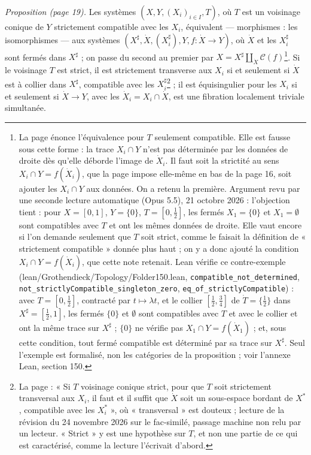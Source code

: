 \documentclass[11pt,a4paper]{article}
\begin{document}
\emph{Proposition (page 19).} Les systèmes $(X, Y, (X_i)_{i \in I}, T)$, où $T$
est un voisinage conique de $Y$ strictement compatible avec les $X_i$, équivalent
— morphismes : les isomorphismes — aux systèmes $(X^{\sharp}, \dot X, (X^{\sharp}_i),
Y, f : \dot X \to Y)$, où $\dot X$ et les $X^{\sharp}_i$ sont fermés dans
$X^{\sharp}$ ; on passe du second au premier par $X = X^{\sharp}
\amalg_{\dot X} \mathcal{C}(f)$\footnote{La page énonce l'équivalence pour $T$
seulement compatible. Elle est fausse sous cette forme : la trace $X_i \cap Y$
n'est pas déterminée par les données de droite dès qu'elle déborde l'image de
$\dot X_i$. Il faut soit la strictité au sens $X_i \cap Y = f(\dot X_i)$, que
la page impose elle-même en bas de la page 16, soit ajouter les $X_i \cap Y$ aux données. On a retenu la première. Argument revu par une seconde lecture automatique (Opus 5.5), 21 octobre 2026 : l'objection tient : pour $X = [0,1]$, $Y = \{0\}$, $T = [0,\frac12]$, les fermés $X_1 = \{0\}$ et $X_1 = \emptyset$ sont compatibles avec $T$ et ont les mêmes données de droite. Elle vaut encore si l'on demande seulement que $T$ soit strict, comme le faisait la définition de « strictement compatible » donnée plus haut ; on y a donc ajouté la condition $X_i \cap Y = f(\dot X_i)$, que cette note retenait. Lean vérifie ce contre-exemple (lean/Grothendieck/Topology/Folder150.lean, \texttt{compatible\_not\_determined}, \texttt{not\_strictlyCompatible\_singleton\_zero}, \texttt{eq\_of\_strictlyCompatible}) : avec $T = [0, \frac12]$, contracté par $t \mapsto \lambda t$, et le collier $[\frac12, \frac34]$ de $\dot T = \{\frac12\}$ dans $X^{\sharp} = [\frac12, 1]$, les fermés $\{0\}$ et $\emptyset$ sont compatibles avec $T$ et avec le collier et ont la même trace sur $X^{\sharp}$ ; $\{0\}$ ne vérifie pas $X_1 \cap Y = f(\dot X_1)$ ; et, sous cette condition, tout fermé compatible est déterminé par sa trace sur $X^{\sharp}$. Seul l'exemple est formalisé, non les catégories de la proposition ; voir l'annexe Lean, section 150.}. Si le voisinage $T$ est strict, il est strictement transverse
aux $X_i$ si et seulement si $\dot X$ est à collier dans $X^{\sharp}$, compatible
avec les $X^{\sharp}_i$\footnote{La page : « Si $T$ voisinage conique strict, pour que $T$ soit strictement transversal aux $X_i$, il faut et il suffit que $\dot X$ soit un sous-espace bordant de $X^{*}$, compatible avec les $X_i^{*}$ », où « transversal » est douteux ; lecture de la révision du 24 novembre 2026 sur le fac-similé, passage machine non relu par un lecteur. « Strict » y est une hypothèse sur $T$, et non une partie de ce qui est caractérisé, comme la lecture l'écrivait d'abord.} ; il est équisingulier pour les $X_i$ si et seulement si
$\dot X \to Y$, avec les $\dot X_i = X_i \cap \dot X$, est une fibration
localement triviale simultanée.
\end{document}

